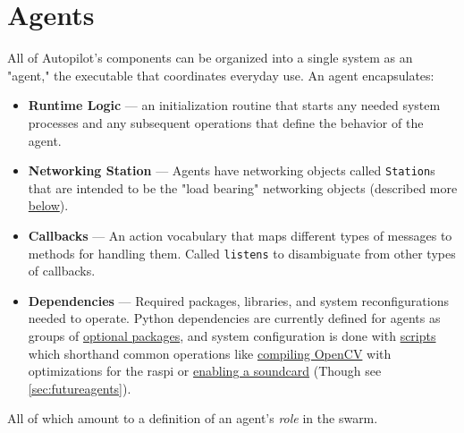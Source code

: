 \section{Agents}
\label{sec:agents}

All of Autopilot's components can be organized into a single system as an "agent," the executable that coordinates everyday use. An agent encapsulates:

\begin{itemize}
\item \textbf{Runtime Logic} --- an initialization routine that starts any needed system processes and any subsequent operations that define the behavior of the agent.
\item \textbf{Networking Station} --- Agents have networking objects called \texttt{Station}s that are intended to be the "load bearing" networking objects (described more \hyperref[sec:networking]{below}).
\item \textbf{Callbacks} --- An action vocabulary that maps different types of messages to methods for handling them. Called \texttt{listens} to disambiguate from other types of callbacks.
\item \textbf{Dependencies} --- Required packages, libraries, and system reconfigurations needed to operate. Python dependencies are currently defined for agents as groups of \href{https://peps.python.org/pep-0621/\#dependencies-optional-dependencies}{optional packages}, and system configuration is done with \href{https://docs.auto-pi-lot.com/en/latest/setup/scripts.html}{scripts} which shorthand common operations like \href{https://github.com/auto-pi-lot/autopilot/blob/90956187d4222f16f67ab8b39b8359da954d5dcc/autopilot/setup/scripts.py\#L140-L183}{compiling OpenCV} with optimizations for the raspi or \href{https://github.com/auto-pi-lot/autopilot/blob/90956187d4222f16f67ab8b39b8359da954d5dcc/autopilot/setup/scripts.py\#L92-L100}{enabling a soundcard} (Though see \ref{sec:futureagents}).
\end{itemize}

All of which amount to a definition of an agent's \textit{role} in the swarm.

\clearpage

